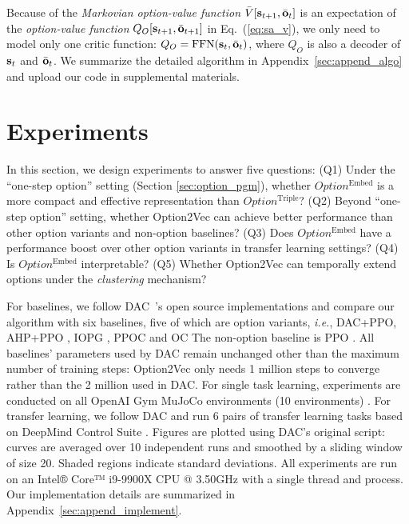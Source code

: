 \documentclass[10pt,journal,compsoc]{IEEEtran}
\renewcommand{\cite}{\citep}
\begin{document}
Because of the \emph{Markovian option-value function} $\bar{V}[
{\mathbf{s}}_{t+1},\bar{{\mathbf{o}}}_{t} ]$ is an expectation of the
\emph{option-value function} $Q_O[{\mathbf{s}}_{t+1},\bar{{\mathbf{o}}}_{t+1}]$
in Eq.~(\ref{eq:sa_v}), we only need to model only one critic
function: $Q_O=\text{FFN}({\mathbf{s}}_t,\bar{{\mathbf{o}}}_t)$, where $Q_O$ is
also a decoder of ${\mathbf{s}}_t$ and $\bar{{\mathbf{o}}}_t$. We summarize the
detailed algorithm in Appendix~\ref{sec:append_algo} and upload
our code in supplemental materials.

\section{Experiments}
\label{sec:exp}
In this section, we design experiments to answer five questions:
(Q1) Under the ``one-step option'' setting (Section
\ref{sec:option_pgm}), whether $Option^{\textrm{Embed}}$ is a more compact and effective representation than
$Option^{\textrm{Triple}}$? (Q2) Beyond ``one-step option''
setting, whether Option2Vec can achieve better performance than other option variants and non-option baselines? (Q3) Does $Option^{\textrm{Embed}}$ have a performance boost over other option variants in transfer learning settings? (Q4) Is $Option^{\textrm{Embed}}$ interpretable? (Q5) Whether Option2Vec can temporally extend options under the \emph{clustering} mechanism?

For baselines, we follow DAC~\cite{zhang2019dac}'s open source
implementations and compare our algorithm with six baselines,
five of which are option variants, \textit{i.e.}, DAC+PPO, AHP+PPO
\cite{levy2011unified}, IOPG \cite{smith2018inference}, PPOC
\cite{klissarov2017learnings} and OC \cite{bacon2017option} The
non-option baseline is PPO \cite{schulman2017proximal}. All
baselines' parameters used by DAC remain unchanged other than the
maximum number of training steps: Option2Vec only needs 1 million
steps to converge rather than the 2 million used in DAC. For
single task learning, experiments are conducted on all OpenAI Gym
MuJoCo environments (10 environments) \cite{brockman2016openai}.
For transfer learning, we follow DAC and run 6 pairs of transfer
learning tasks based on DeepMind Control Suite
\cite{tassa2020dmcontrol}. Figures are plotted using DAC's
original script: curves are averaged over 10 independent runs and
smoothed by a sliding window of size 20. Shaded regions indicate
standard deviations. All experiments are run on an Intel® Core™
i9-9900X CPU @ 3.50GHz with a single thread and process. Our
implementation details are summarized in
Appendix~\ref{sec:append_implement}.
\end{document}
